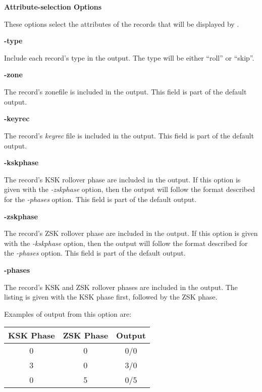 {\bf Attribute-selection Options}

These options select the attributes of the records that will be displayed
by .

\begin{description}

\item {\bf -type}\verb" "

Include each  record's type in the output.  The type will be
either ``roll'' or ``skip''.

\item {\bf -zone}\verb" "

The record's zonefile is included in the output.  This field is part
of the default output.

\item {\bf -keyrec}\verb" "

The record's {\it keyrec} file is included in the output.
This field is part of the default output.

\item {\bf -kskphase}\verb" "

The record's KSK rollover phase are included in the output.
If this option is given with the {\it -zskphase} option, then the output will
follow the format described for the {\it -phases} option.
This field is part of the default output.

\item {\bf -zskphase}\verb" "

The record's ZSK rollover phase are included in the output.
If this option is given with the {\it -kskphase} option, then the output will
follow the format described for the {\it -phases} option.
This field is part of the default output.

\item {\bf -phases}\verb" "

The record's KSK and ZSK rollover phases are included in the output.
The listing is given with the KSK phase first, followed by the ZSK phase.

Examples of output from this option are:

\begin{table}[ht]
\begin{center}
\begin{tabular}{|c|c|c|}
\hline
{\bf KSK Phase} & {\bf ZSK Phase} & {\bf Output} \\
\hline
0 & 0 & 0/0 \\
3 & 0 & 3/0 \\
0 & 5 & 0/5 \\
\hline
\end{tabular}
\end{center}
\end{table}


\end{description}
